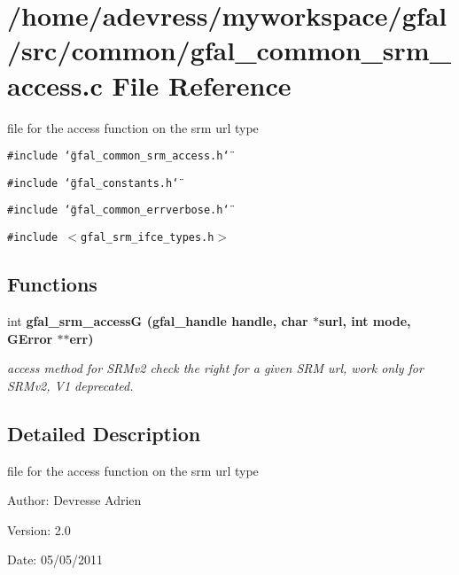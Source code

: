 \section{/home/adevress/myworkspace/gfal/src/common/gfal\_\-common\_\-srm\_\-access.c File Reference}
\label{gfal__common__srm__access_8c}
file for the access function on the srm url type 

{\tt \#include \char`\"{}gfal\_\-common\_\-srm\_\-access.h\char`\"{}}\par
{\tt \#include \char`\"{}gfal\_\-constants.h\char`\"{}}\par
{\tt \#include \char`\"{}gfal\_\-common\_\-errverbose.h\char`\"{}}\par
{\tt \#include $<$gfal\_\-srm\_\-ifce\_\-types.h$>$}\par
\subsection*{Functions}
\begin{CompactItemize}
\item 
int \bf{gfal\_\-srm\_\-access\-G} (gfal\_\-handle handle, char $\ast$surl, int mode, GError $\ast$$\ast$err)
\begin{CompactList}\small\item\em access method for SRMv2 check the right for a given SRM url, work only for SRMv2, V1 deprecated. \item\end{CompactList}\end{CompactItemize}


\subsection{Detailed Description}
file for the access function on the srm url type 

\begin{Desc}
\item[Author:]Devresse Adrien \end{Desc}
\begin{Desc}
\item[Version:]2.0 \end{Desc}
\begin{Desc}
\item[Date:]05/05/2011 \end{Desc}


